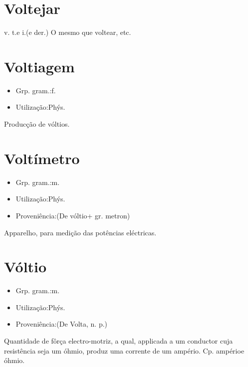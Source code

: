 \documentclass{article}
\begin{document}
\section{Voltejar}
\textunderscore v. t.\textunderscore  e \textunderscore i.\textunderscore  (e der.)
O mesmo que \textunderscore voltear\textunderscore , etc.
\section{Voltiagem}
\begin{itemize}
\item {Grp. gram.:f.}
\end{itemize}
\begin{itemize}
\item {Utilização:Phýs.}
\end{itemize}
Producção de vóltios.
\section{Voltímetro}
\begin{itemize}
\item {Grp. gram.:m.}
\end{itemize}
\begin{itemize}
\item {Utilização:Phýs.}
\end{itemize}
\begin{itemize}
\item {Proveniência:(De \textunderscore vóltio\textunderscore  + gr. \textunderscore metron\textunderscore )}
\end{itemize}
Apparelho, para medição das potências eléctricas.
\section{Vóltio}
\begin{itemize}
\item {Grp. gram.:m.}
\end{itemize}
\begin{itemize}
\item {Utilização:Phýs.}
\end{itemize}
\begin{itemize}
\item {Proveniência:(De \textunderscore Volta\textunderscore , n. p.)}
\end{itemize}
Quantidade de fôrça electro-motriz, a qual, applicada a um conductor cuja resistência seja um óhmio, produz uma corrente de um ampério. Cp. \textunderscore ampério\textunderscore  e \textunderscore óhmio\textunderscore .
\end{document}
